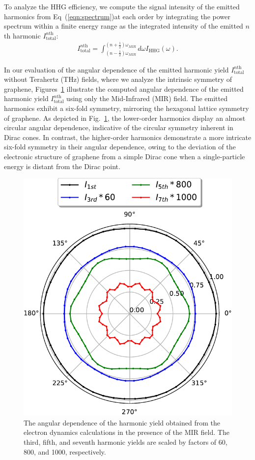 To analyze the HHG efficiency, we compute the signal intensity of the emitted harmonics from
Eq~(\ref{eqn:spectrum})at each
order by integrating the power spectrum within a finite energy range as  the integrated intensity
of the emitted $n$th harmonic $I^{n \textrm{th}}_{\mathrm{total}}$:
\begin{align}
I^{n \textrm{th}}_{\mathrm{total}} = \int_{\left (n-\frac{1}{2} \right )\omega_{MIR}}^{\left (n+\frac{1}{2} \right )\omega_{MIR}} d \omega I_{\textrm{HHG}} (\omega).
\label{eqn:integrate_intensity}
\end{align}

In our evaluation of the angular dependence of the emitted harmonic yield $I^{n \textrm{th}}_{\mathrm{total}}$ without Terahertz (THz) fields, where we analyze the intrinsic symmetry of graphene, Figures~\ref{fig:SI_polar_mir} illustrate the computed angular dependence of the emitted harmonic yield $I^{n \textrm{th}}_{\mathrm{total}}$ using only the Mid-Infrared (MIR) field. The emitted harmonics exhibit a six-fold symmetry, mirroring the hexagonal lattice symmetry of graphene. As depicted in Fig.~\ref{fig:SI_polar_mir}, the lower-order harmonics display an almost circular angular dependence, indicative of the circular symmetry inherent in Dirac cones. In contrast, the higher-order harmonics demonstrate a more intricate six-fold symmetry in their angular dependence, owing to the deviation of the electronic structure of graphene from a simple Dirac cone when a single-particle energy is distant from the Dirac point.
\begin{figure}[tb]
\centering
\includegraphics[width=0.50\linewidth]{pic/polar_mir.pdf}
\caption{\label{fig:SI_polar_mir}
The angular dependence of the harmonic yield obtained from the electron dynamics calculations in the presence of the MIR field. The third, fifth, and seventh harmonic yields are scaled by factors of 60, 800, and 1000, respectively.
}
\end{figure}
